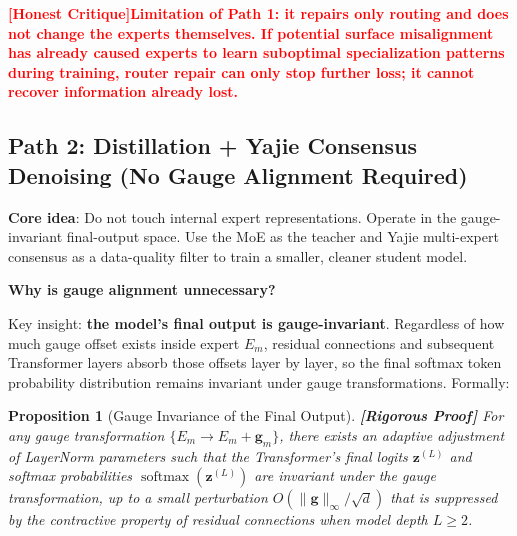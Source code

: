 \documentclass[12pt,a4paper]{article}
\newtheorem{proposition}[theorem]{Proposition}
\theoremstyle{remark}
\DeclareMathOperator{\softmax}{softmax}
\newcommand{\honestcrit}[1]{%
    \textcolor{red}{\textbf{[Honest Critique]#1}}%
}
\newcommand{\rigorFull}{\textnormal{\textbf{[Rigorous Proof]}}}
\begin{document}
\honestcrit{Limitation of Path 1: it repairs only routing and does not change the experts themselves. If potential surface misalignment has already caused experts to learn suboptimal specialization patterns during training, router repair can only stop further loss; it cannot recover information already lost.}

\subsection{Path 2: Distillation + Yajie Consensus Denoising (No Gauge Alignment Required)}

\textbf{Core idea}: Do not touch internal expert representations. Operate in the gauge-invariant final-output space. Use the MoE as the teacher and Yajie multi-expert consensus as a data-quality filter to train a smaller, cleaner student model.

\textbf{Why is gauge alignment unnecessary?}

Key insight: \textbf{the model's final output is gauge-invariant}. Regardless of how much gauge offset exists inside expert $E_m$, residual connections and subsequent Transformer layers absorb those offsets layer by layer, so the final softmax token probability distribution remains invariant under gauge transformations. Formally:

\begin{proposition}[Gauge Invariance of the Final Output]\label{prop:output_invariance}\rigorFull
For any gauge transformation $\{E_m \to E_m + \mathbf{g}_m\}$, there exists an adaptive adjustment of LayerNorm parameters such that the Transformer's final logits $\mathbf{z}^{(L)}$ and softmax probabilities $\softmax(\mathbf{z}^{(L)})$ are invariant under the gauge transformation, up to a small perturbation $O(\|\mathbf{g}\|_\infty / \sqrt{d})$ that is suppressed by the contractive property of residual connections when model depth $L \geq 2$.
\end{proposition}
\end{document}
